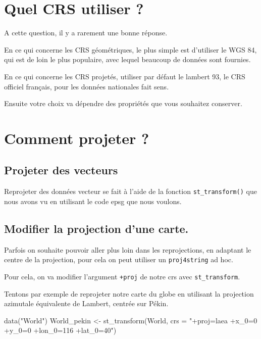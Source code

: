 \documentclass[
]{book}
\newenvironment{Shaded}{\begin{snugshade}}{\end{snugshade}}
\newcommand{\AttributeTok}[1]{\textcolor[rgb]{0.77,0.63,0.00}{#1}}
\newcommand{\FunctionTok}[1]{\textcolor[rgb]{0.00,0.00,0.00}{#1}}
\newcommand{\NormalTok}[1]{#1}
\newcommand{\OtherTok}[1]{\textcolor[rgb]{0.56,0.35,0.01}{#1}}
\newcommand{\StringTok}[1]{\textcolor[rgb]{0.31,0.60,0.02}{#1}}
\begin{document}
\hypertarget{quel-crs-utiliser}{%
\section{Quel CRS utiliser ?}\label{quel-crs-utiliser}}

A cette question, il y a rarement une bonne réponse.

En ce qui concerne les CRS géométriques, le plus simple est d'utiliser le WGS 84, qui est de loin le plus populaire, avec lequel beaucoup de données sont fournies.

En ce qui concerne les CRS projetés, utiliser par défaut le lambert 93, le CRS officiel français, pour les données nationales fait sens.

Ensuite votre choix va dépendre des propriétés que vous souhaitez conserver.

\hypertarget{comment-projeter}{%
\section{Comment projeter ?}\label{comment-projeter}}

\hypertarget{projeter-des-vecteurs}{%
\subsection{Projeter des vecteurs}\label{projeter-des-vecteurs}}

Reprojeter des données vecteur se fait à l'aide de la fonction \texttt{st\_transform()} que nous avons vu en utilisant le code epsg que nous voulons.

\hypertarget{modifier-la-projection-dune-carte.}{%
\subsection{Modifier la projection d'une carte.}\label{modifier-la-projection-dune-carte.}}

Parfois on souhaite pouvoir aller plus loin dans les reprojections, en adaptant le centre de la projection, pour cela on peut utiliser un \texttt{proj4string} ad hoc.

Pour cela, on va modifier l'argument \texttt{+proj} de notre crs avec \texttt{st\_transform}.

Tentons par exemple de reprojeter notre carte du globe en utilisant la projection azimutale équivalente de Lambert, centrée sur Pékin.

\begin{Shaded}
\begin{Highlighting}[]
\FunctionTok{data}\NormalTok{(}\StringTok{"World"}\NormalTok{)}
\NormalTok{World\_pekin }\OtherTok{\textless{}{-}} \FunctionTok{st\_transform}\NormalTok{(World, }\AttributeTok{crs =} \StringTok{"+proj=laea +x\_0=0 +y\_0=0 +lon\_0=116 +lat\_0=40"}\NormalTok{)}
\end{Highlighting}
\end{Shaded}
\end{document}
